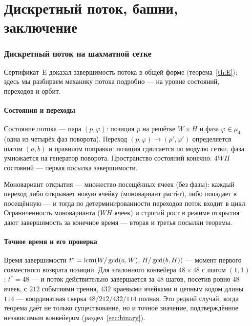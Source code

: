 \part{Дискретный поток, башни, заключение}

\section{Дискретный поток на шахматной сетке}\label{sec:flow}

Сертификат~E доказал завершимость потока в общей форме
(теорема~\ref{th:E}); здесь мы разбираем механику потока
подробно --- на уровне состояний, переходов и орбит.

\subsection{Состояния и переходы}

Состояние потока --- пара $(p,\varphi)$: позиция $p$ на решётке
$W\times H$ и фаза $\varphi\in\mu_4$ (одна из четырёх фаз поворота).
Переход $(p,\varphi)\to(p',\varphi')$ определяется шагом
$(a,b)$ и правилом поправки: позиция сдвигается по модулю сетки,
фаза умножается на генератор поворота. Пространство состояний
конечно: $4WH$ состояний --- первая посылка завершимости.

Моновариант открытия --- множество посещённых ячеек (без фазы):
каждый переход либо открывает новую ячейку (моновариант растёт),
либо попадает в посещённую --- и тогда по детерминированности
переходов поток входит в цикл. Ограниченность моноварианта
($WH$ ячеек) и строгий рост в режиме открытия дают завершимость за
конечное время --- вторая и третья посылки теоремы.

\subsection{Точное время и его проверка}

Время завершимости $t^*=\operatorname{lcm}(W/\gcd(a,W),\,H/\gcd(b,H))$ ---
момент первого совместного возврата позиции. Для эталонного
конвейера $48\times48$ с шагом $(1,1)$: $t^*=48$ --- и поток
действительно завершается за $48$ шагов, посетив ровно $48$
ячеек, с $212$ событиями трения, $432$ краевыми ячейками и цепным
кодом длины $114$ --- координатная сверка $48/212/432/114$
полная. Это редкий случай, когда теорема даёт не только
существование, но и точное значение, подтверждённое независимым
конвейером (раздел~\ref{sec:binary}).

